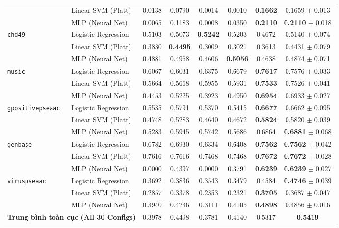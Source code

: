 \documentclass[11pt,a4paper]{article}
\begin{document}
\begin{table}[H]
{\begin{tabular}{llcccccc}
 & Linear SVM (Platt) & 0.0138 & 0.0790 & 0.0014 & 0.0010 & \textbf{0.1662} & 0.1659 $\pm$ 0.013 \\
 & MLP (Neural Net) & 0.0065 & 0.1183 & 0.0008 & 0.0350 & \textbf{0.2110} & \textbf{0.2110} $\pm$ 0.018 \\
\midrule
\multirow{3}{*}{\texttt{chd49}} & Logistic Regression & 0.5103 & 0.5073 & \textbf{0.5242} & 0.5203 & 0.4672 & 0.5140 $\pm$ 0.074 \\
 & Linear SVM (Platt) & 0.3830 & \textbf{0.4495} & 0.3009 & 0.3021 & 0.3613 & 0.4431 $\pm$ 0.079 \\
 & MLP (Neural Net) & 0.4881 & 0.4968 & 0.4606 & \textbf{0.5056} & 0.4638 & 0.4874 $\pm$ 0.071 \\
\midrule
\multirow{3}{*}{\texttt{music}} & Logistic Regression & 0.6067 & 0.6031 & 0.6375 & 0.6679 & \textbf{0.7617} & 0.7576 $\pm$ 0.033 \\
 & Linear SVM (Platt) & 0.5664 & 0.5668 & 0.5955 & 0.5931 & \textbf{0.7533} & 0.7526 $\pm$ 0.041 \\
 & MLP (Neural Net) & 0.4453 & 0.5225 & 0.3923 & 0.4950 & \textbf{0.6954} & 0.6933 $\pm$ 0.027 \\
\midrule
\multirow{3}{*}{\texttt{gpositivepseaac}} & Logistic Regression & 0.5535 & 0.5791 & 0.5370 & 0.5415 & \textbf{0.6677} & 0.6662 $\pm$ 0.095 \\
 & Linear SVM (Platt) & 0.4748 & 0.5283 & 0.4640 & 0.4672 & \textbf{0.5824} & 0.5820 $\pm$ 0.039 \\
 & MLP (Neural Net) & 0.5283 & 0.5945 & 0.5742 & 0.5686 & 0.6864 & \textbf{0.6881} $\pm$ 0.068 \\
\midrule
\multirow{3}{*}{\texttt{genbase}} & Logistic Regression & 0.6782 & 0.6930 & 0.6334 & 0.6408 & \textbf{0.7562} & \textbf{0.7562} $\pm$ 0.042 \\
 & Linear SVM (Platt) & 0.7616 & 0.7616 & 0.7468 & 0.7468 & \textbf{0.7672} & \textbf{0.7672} $\pm$ 0.028 \\
 & MLP (Neural Net) & 0.0000 & 0.4397 & 0.0000 & 0.3791 & \textbf{0.6239} & \textbf{0.6239} $\pm$ 0.027 \\
\midrule
\multirow{3}{*}{\texttt{viruspseaac}} & Logistic Regression & 0.3692 & 0.3836 & 0.3543 & 0.3479 & 0.4584 & \textbf{0.4746} $\pm$ 0.039 \\
 & Linear SVM (Platt) & 0.2857 & 0.3378 & 0.2353 & 0.2321 & \textbf{0.3705} & 0.3687 $\pm$ 0.047 \\
 & MLP (Neural Net) & 0.3940 & 0.4236 & 0.3111 & 0.4105 & \textbf{0.4898} & 0.4856 $\pm$ 0.016 \\
\midrule
\multicolumn{2}{l}{\textbf{Trung bình toàn cục (All 30 Configs)}} & 0.3978 & 0.4498 & 0.3781 & 0.4140 & 0.5317 & \textbf{0.5419} \\
\bottomrule
\end{tabular}%
}
\end{table}
\clearpage
\end{document}
